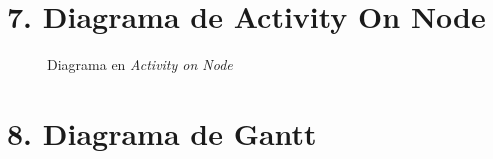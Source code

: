 \documentclass[11pt]{charter}
\begin{document}



\section{7. Diagrama de Activity On Node}
\label{sec:AoN}


\begin{figure}[htpb]
\centering 
{}
\caption{Diagrama en \textit{Activity on Node}}
\label{fig:AoN}
\end{figure}


\newpage
\section{8. Diagrama de Gantt}
\label{sec:gantt}
\end{document}
